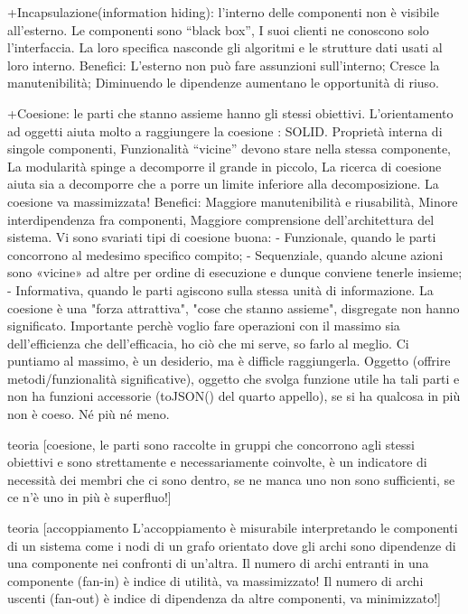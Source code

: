 \documentclass{report}
\begin{document}
+Incapsulazione(information hiding): l'interno delle componenti non è visibile all'esterno. Le componenti sono “black box”, I suoi clienti ne conoscono solo l’interfaccia. La loro specifica nasconde gli algoritmi e le strutture dati usati al loro interno. Benefici: L’esterno non può fare assunzioni sull’interno; Cresce la manutenibilità; Diminuendo le dipendenze aumentano le opportunità di riuso.

+Coesione: le parti che stanno assieme hanno gli stessi obiettivi.
L’orientamento ad oggetti aiuta molto a raggiungere la coesione : SOLID.
Proprietà interna di singole componenti, Funzionalità “vicine” devono stare nella stessa componente, La modularità spinge a decomporre il grande in piccolo, La ricerca di coesione aiuta sia a decomporre che a porre un limite inferiore alla decomposizione.
La coesione va massimizzata!
Benefici: Maggiore manutenibilità e riusabilità, Minore interdipendenza fra componenti, Maggiore comprensione dell’architettura del sistema.
Vi sono svariati tipi di coesione buona:
- Funzionale, quando le parti concorrono al medesimo specifico compito;
- Sequenziale, quando alcune azioni sono «vicine» ad altre per ordine di esecuzione e dunque conviene tenerle insieme;
- Informativa, quando le parti agiscono sulla stessa unità di informazione.
La coesione è una "forza attrattiva", "cose che stanno assieme", disgregate non hanno significato. Importante perchè voglio fare operazioni con il massimo sia dell'efficienza che dell'efficacia, ho ciò che mi serve, so farlo al meglio. Ci puntiamo al massimo, è un desiderio, ma è difficle raggiungerla. Oggetto (offrire metodi/funzionalità significative), oggetto che svolga funzione utile ha tali parti e non ha funzioni accessorie (toJSON() del quarto appello), se si ha qualcosa in più non è coeso. Né più né meno.

teoria [coesione, le parti sono raccolte in gruppi che concorrono agli stessi obiettivi e sono strettamente e necessariamente coinvolte, è un indicatore di necessità dei membri che ci sono dentro, se ne manca uno non sono sufficienti, se ce n’è uno in più è superfluo!]

teoria [accoppiamento L’accoppiamento è misurabile interpretando le componenti di un sistema come i nodi di un grafo orientato dove gli archi sono dipendenze di una componente nei confronti di un’altra. Il numero di archi entranti in una componente (fan-in) è indice di utilità, va massimizzato! Il numero di archi uscenti (fan-out) è indice di dipendenza da altre componenti, va minimizzato!]
\end{document}
